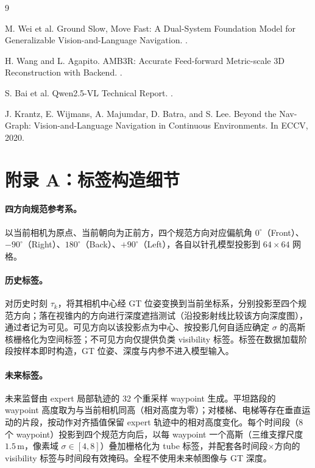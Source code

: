 \documentclass[10pt]{ctexart}
\begin{document}
\begin{thebibliography}{9}

M. Wei et al.
\newblock Ground Slow, Move Fast: A Dual-System Foundation Model for
Generalizable Vision-and-Language Navigation.
.

H. Wang and L. Agapito.
\newblock AMB3R: Accurate Feed-forward Metric-scale 3D Reconstruction
with Backend.
.

S. Bai et al.
\newblock Qwen2.5-VL Technical Report.
.

J. Krantz, E. Wijmans, A. Majumdar, D. Batra, and S. Lee.
\newblock Beyond the Nav-Graph: Vision-and-Language Navigation in
Continuous Environments.
\newblock In ECCV, 2020.

\end{thebibliography}

\section*{附录 A：标签构造细节}

\paragraph{四方向规范参考系。}
以当前相机为原点、当前朝向为正前方，四个规范方向对应偏航角 $0^{\circ}$（Front）、$-90^{\circ}$（Right）、$180^{\circ}$（Back）、$+90^{\circ}$（Left），各自以针孔模型投影到 $64\times64$ 网格。

\paragraph{历史标签。}
对历史时刻 $\tau_k$，将其相机中心经 GT 位姿变换到当前坐标系，分别投影至四个规范方向；落在视锥内的方向进行深度遮挡测试（沿投影射线比较该方向深度图），通过者记为可见。可见方向以该投影点为中心、按投影几何自适应确定 $\sigma$ 的高斯核栅格化为空间标签；不可见方向仅提供负类 visibility 标签。标签在数据加载阶段按样本即时构造，GT 位姿、深度与内参不进入模型输入。

\paragraph{未来标签。}
未来监督由 expert 局部轨迹的 32 个重采样 waypoint 生成。平坦路段的 waypoint 高度取为与当前相机同高（相对高度为零）；对楼梯、电梯等存在垂直运动的片段，按动作对齐插值保留 expert 轨迹中的相对高度变化。每个时间段（8 个 waypoint）投影到四个规范方向后，以每 waypoint 一个高斯（三维支撑尺度 $1.5\,\mathrm{m}$，像素域 $\sigma\in[4,8]$）叠加栅格化为 tube 标签，并配套各时间段$\times$方向的 visibility 标签与时间段有效掩码。全程不使用未来帧图像与 GT 深度。
\end{document}
